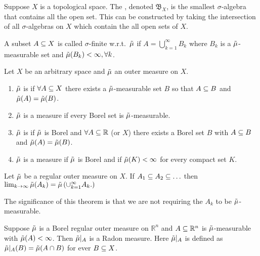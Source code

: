 \begin{defn}
  Suppose $X$ is a topological space. The , denoted $\mathfrak{B}_X$, is the smallest $\sigma$-algebra that contains all
  the open set. This can be constructed by taking the intersection of
  all $\sigma$-algebras on $X$ which contain the all open sets of
  $X$.
\end{defn}

\begin{defn}
  A subset $A\subseteq X$ is called $\sigma$-finite w.r.t.\ $\tilde{\mu}$ if
  $A=\bigcup_{k=1}^\infty B_k$ where $B_k$ is a $\tilde{\mu}$-measurable set and
  $\tilde{\mu}(B_k)<\infty, \forall k$.
\end{defn}

\begin{defn}\mbox{}
  Let $X$ be an arbitrary space and $\tilde{\mu}$ an outer measure on $X$.
  \begin{enumerate}
    \item $\tilde{\mu}$ is  if $\forall A\subseteq X$ there exists a
      $\tilde{\mu}$-measurable set $B$ so that $A\subseteq B$ and $\tilde{\mu}(A) = \tilde{\mu}(B)$.
    \item $\tilde{\mu}$ is a  measure if every Borel set is
      $\tilde{\mu}$-measurable.
    \item $\tilde{\mu}$ is  if $\tilde{\mu}$ is Borel and
      $\forall A\subseteq \mathbb{R}$ (or $X$) there exists a Borel set
      $B$ with $A\subseteq B$ and $\tilde{\mu}(A)=\tilde{\mu}(B)$.
    \item $\tilde{\mu}$ is a  measure if $\tilde{\mu}$ is Borel and if
      $\tilde{\mu}(K)<\infty$ for every compact set $K$.
  \end{enumerate}
\end{defn}

\begin{thm}\cite[thm 2]{evans1991measure}
  Let $\tilde{\mu}$ be a regular outer measure on $X$. If $A_1\subseteq A_2 \subseteq \ldots$
  then $\lim_{k\to \infty}\tilde{\mu}(A_k) = \tilde{\mu}\left( \cup_{k=1}^\infty A_k.
  \right)$
\end{thm}

\begin{remark}
The significance of this theorem is that we are not requiring the $A_k$
to be $\tilde{\mu}$-measurable.
\end{remark}

\begin{thm}\cite[thm 3]{evans1991measure}
  Suppose $\tilde{\mu}$ is a Borel regular outer measure on $\mathbb{R}^n$ and $A\subseteq
  \mathbb{R}^n$ is $\tilde{\mu}$-measurable with $\tilde{\mu}(A)<\infty$. Then
  $\tilde{\mu}\rvert_A$ is a Radon measure. Here $\tilde{\mu}\rvert_A$ is defined as
  $\tilde{\mu}\rvert_A(B)= \tilde{\mu}(A\cap B)$ for ever $B\subseteq X$.
\end{thm}

